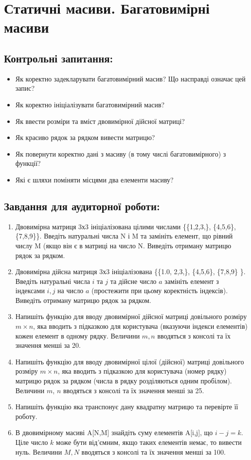\documentclass[a5paper,titlepage,openany,twoside,
]
{book_unv}%
\begin{document}
\chapter{ Статичні масиви. Багатовимірні масиви }
%

\section{Контрольні запитання:}
\begin{itemize}
\item
Як коректно задекларувати багатовимірний масив?
Що насправді означає цей запис?
\item
Як коректно ініціалізувати багатовимірний масив?
\item
  Як ввести розміри та вміст двовимірної
  дійсної матриці?
\item
 Як красиво рядок за рядком вивести матрицю?
\item
  Як повернути коректно дані з масиву 
(в тому числі багатовимірного) з функції?
\item
Які є шляхи поміняти місцями два елементи масиву? 
\end{itemize}

\section{Завдання для аудиторної роботи:}

\begin{enumerate}
\def\labelenumi{\arabic{enumi})}
\item
  Двовимірна матриця 3х3 ініціалізована цілими числами
  \{\{1,2,3,\}, \{4,5,6\}, \{7,8,9\}\}. Введіть
  натуральні числа N і M та замініть елемент, що рівний числу M (якщо
  він є в матриці на число N. Виведіть отриману матрицю рядок за
  рядком.
\item
  Двовимірна дійсна матриця 3х3 ініціалізована \{\{1.0,
  2,3,\}, \{4,5,6\}, \{7,8,9\} \}. Введіть
  натуральні числа $i$ та $j$ та дійсне число $a$ замініть елемент з індексами
  $i,j$ на число $a$ (простежити при цьому коректність індексів). Виведіть
  отриману матрицю рядок за рядком.
\item
  Напишіть функцію для вводу двовимірної дійсної матриці довільного
  розміру $m \times n$, яка вводить з підказкою для користувача (вказуючи
  індекси елементів) кожен елемент в одному рядку. Величини $m, n$
  вводяться з консолі та їх значення менші за 20.
\item
  Напишіть функцію для вводу двовимірної цілої (дійсної) матриці
  довільного розміру $m \times n$, яка вводить з підказкою для користувача
  (номер рядку) матрицю рядок за рядком (числа в рядку розділяються
  одним пробілом). Величини $m$, $n$ вводяться з консолі та їх значення
  менші за 25.
\item
 Напишіть функцію яка транспонує дану квадратну матрицю та перевірте її
роботу.
\item
  В двовимірному масиві A{[}N,M{]} знайдіть суму елементів A{[}i,j{]},
  що $i-j=k$. Ціле число $k$ може бути від'ємним, якщо таких елементів
  немає, то вивести нуль. Величини $M, N$ вводяться з консолі та їх
  значення менші за 100.
\end{enumerate}
\end{document}
